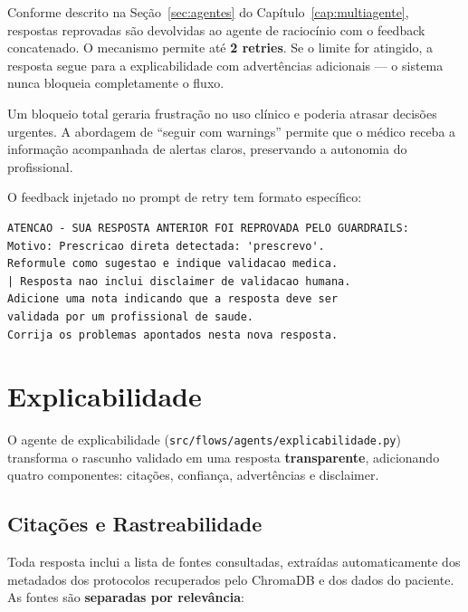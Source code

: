 Conforme descrito na Seção~\ref{sec:agentes} do Capítulo~\ref{cap:multiagente}, respostas reprovadas são devolvidas ao agente de raciocínio com o feedback concatenado. O mecanismo permite até \textbf{2 retries}. Se o limite for atingido, a resposta segue para a explicabilidade com advertências adicionais --- o sistema nunca bloqueia completamente o fluxo.

\begin{importantbox}
Um bloqueio total geraria frustração no uso clínico e poderia atrasar decisões urgentes. A abordagem de ``seguir com warnings'' permite que o médico receba a informação acompanhada de alertas claros, preservando a autonomia do profissional.
\end{importantbox}

O feedback injetado no prompt de retry tem formato específico:

\begin{lstlisting}[caption={Feedback de retry injetado no prompt do raciocínio.}]
ATENCAO - SUA RESPOSTA ANTERIOR FOI REPROVADA PELO GUARDRAILS:
Motivo: Prescricao direta detectada: 'prescrevo'.
Reformule como sugestao e indique validacao medica.
| Resposta nao inclui disclaimer de validacao humana.
Adicione uma nota indicando que a resposta deve ser
validada por um profissional de saude.
Corrija os problemas apontados nesta nova resposta.
\end{lstlisting}

\section{Explicabilidade}\label{sec:explicabilidade}

O agente de explicabilidade (\texttt{src/flows/agents/explicabilidade.py}) transforma o rascunho validado em uma resposta \textbf{transparente}, adicionando quatro componentes: citações, confiança, advertências e disclaimer.

\subsection{Citações e Rastreabilidade}

Toda resposta inclui a lista de fontes consultadas, extraídas automaticamente dos metadados dos protocolos recuperados pelo ChromaDB e dos dados do paciente. As fontes são \textbf{separadas por relevância}:

